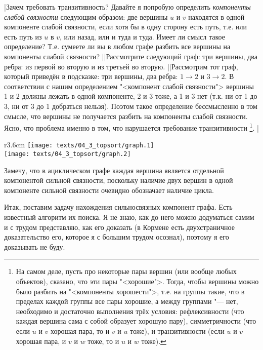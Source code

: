 \task|Зачем требовать транзитивность? Давайте я попробую определить \emph{компоненты слабой связности} следующим 
образом: две вершины $u$ и $v$ находятся в одной компоненте слабой связности, если хотя бы в одну сторону есть путь, 
т.е. или есть путь из $u$ в $v$, или назад, или и туда и туда. Имеет ли смысл такое определение? Т.е. сумеете ли вы
в любом графе разбить все вершины на компоненты слабой связности?
||Рассмотрите следующий граф: три вершины, два ребра: из первой во вторую и из третьей во вторую.
||Рассмотрим тот граф, который приведён в подсказке: три вершины, два ребра: $1\to 2$ и $3\to 2$.
В соответствии с нашим определением "<компонент слабой связности"> вершины 1 и 2 должны лежать в одной компоненте,
2 и 3 тоже, а 1 и 3 нет (т.к. ни от 1 до 3, ни от 3 до 1 добраться нельзя). Поэтом такое определение
бессмысленно в том смысле, что вершины не получается разбить на компоненты слабой связности. Ясно, что проблема
именно в том, что нарушается требование транзитивности%
\footnote{На самом деле, пусть про некоторые пары вершин (или вообще любых объектов), сказано, что эти пары "<хорошие">.
Тогда, чтобы вершины можно было разбить на "<компоненты хорошести">, т.е. на группы такие, что
в пределах каждой группы все пары хорошие, а между группами "--- нет, необходимо и достаточно
выполнения трёх условия: рефлексивности (что каждая вершина сама с собой образует хорошую пару),
симметричности (что если $u$ и $v$ хорошая пара, то и $v$ и $u$ тоже), и транзитивности
(если $u$ и $v$ хорошая пара, и $v$ и $w$ тоже, то и $u$ и $w$ тоже).}.
|\label{transitive}

\begin{wrapfigure}{r}{3.6cm}
\vspace{-0.3cm}
\texttt{[image: texts/04\_3\_topsort/graph.1]}\\[0.2cm]
\texttt{[image: texts/04\_3\_topsort/graph.2]}
\end{wrapfigure}

Замечу, что в ациклическом графе каждая вершина является отдельной компонентой сильной связности, поскольку наличие двух
вершин в одной компоненте сильной связности очевидно обозначает наличие цикла.

Итак, поставим задачу нахождения сильносвязных компонент графа. Есть известный алгоритм их поиска. Я не знаю,
как до него можно додуматься самим и с трудом представляю, как его доказать (в Кормене есть двухстраничное 
доказательство его, которое я с большим трудом осознал), поэтому я его доказывать не буду.

